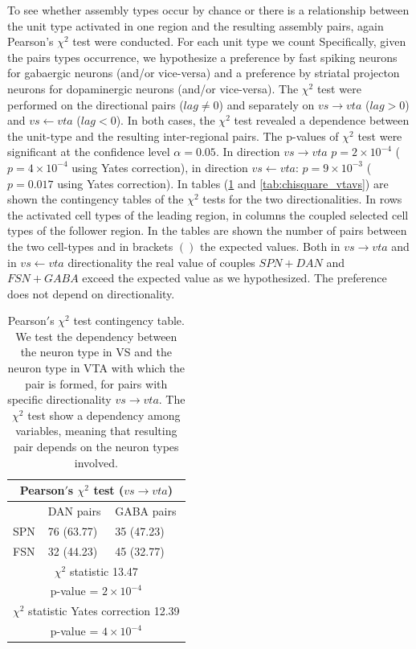 To see whether assembly types occur by chance or there is a relationship between the unit type activated in one region and the resulting assembly pairs, again Pearson's $\chi^2$ test were conducted. For each unit type we count  Specifically, given the pairs types occurrence, we hypothesize a preference by fast spiking neurons for gabaergic neurons (and/or vice-versa) and a preference by striatal projecton neurons for dopaminergic neurons (and/or vice-versa). The $\chi^2$ test were performed on the directional pairs ($lag\neq0$) and separately on $vs\rightarrow vta$ ($lag>0$) and $vs \leftarrow vta$ ($lag<0$). In both cases, the $\chi^2$ test revealed a dependence between the unit-type and the resulting inter-regional pairs. The p-values of $\chi^2$ test were significant at the confidence level $\alpha = 0.05$. In direction $vs\rightarrow vta$ $p=2\times10^{-4}$ ($p=4\times10^{-4}$ using Yates correction), in direction $vs \leftarrow vta$: $p=9\times10^{-3}$ ($p=0.017$ using Yates correction). In tables (\ref{tab:chisquare_vsvta} and \ref{tab:chisquare_vtavs}) are shown the contingency tables of the $\chi^2$ tests for the two directionalities. In rows the activated cell types of the leading region, in columns the coupled selected cell types of the follower region. In the tables are shown the number of pairs between the two cell-types and in brackets $()$ the expected values. Both in $vs\rightarrow vta$ and in $vs\leftarrow vta$ directionality the real value of couples $SPN+DAN$ and $FSN+GABA$ exceed the expected value as we hypothesized. The preference does not depend on directionality.
\begin{table}[H]
\begin{tabular}{ |p{3cm}|p{3cm}|p{3cm}| }
 \hline
 \multicolumn{3}{|c|}{Pearson$'$s $\chi^2$ test ($vs \rightarrow vta$)} \\
 \hline
 & DAN pairs & GABA pairs\\
 \hline
 SPN & 76 (63.77) & 35 (47.23) \\
 \hline
 FSN & 32 (44.23) & 45 (32.77)\\
 \hline
 \multicolumn{3}{|c|}{$\chi^2$ statistic  13.47}\\
 \multicolumn{3}{|c|}{p-value = $2\times10^{-4}$}\\
 \hline
 \multicolumn{3}{|c|}{$\chi^2$ statistic Yates correction 12.39}\\
 \multicolumn{3}{|c|}{p-value = $4\times10^{-4}$}\\
 \hline
\end{tabular}
\caption{Pearson$'$s $\chi^{2}$ test contingency table. We test the dependency between the neuron type in VS and the neuron type in VTA with which the pair is formed, for pairs with specific directionality $vs \rightarrow vta$. The $\chi^2$ test show a dependency among variables, meaning that resulting pair depends on the neuron types involved.}
\label{tab:chisquare_vsvta}
\end{table}

